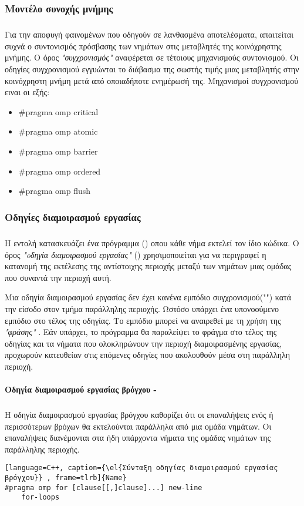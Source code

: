 \subsubsection{Μοντέλο συνοχής μνήμης}
\subparagraph{}
Για την αποφυγή φαινομένων \emph{} που οδηγούν σε λανθασμένα αποτελέσματα, απαιτείται συχνά ο συντονισμός πρόσβασης των νημάτων στις μεταβλητές της κοινόχρηστης μνήμης. Ο όρος \emph{"συγχρονισμός"} αναφέρεται σε τέτοιους μηχανισμούς συντονισμού. Οι οδηγίες συγχρονισμού εγγυώνται το διάβασμα της σωστής τιμής μιας μεταβλητής στην κοινόχρηστη μνήμη μετά από οποιαδήποτε ενημέρωσή της. Μηχανισμοί συγχρονισμού ειναι οι εξής\cite{book2_23}:
\begin{itemize}
    \item {\#}pragma omp critical 
    \item {\#}pragma omp atomic
    \item {\#}pragma omp barrier 
    \item {\#}pragma omp ordered
    \item {\#}pragma omp flush
\end{itemize}

\subsubsection{Οδηγίες διαμοιρασμού εργασίας}
\subparagraph{}
Η εντολή \emph{} κατασκευάζει ένα \emph{} πρόγραμμα (\emph{}) οπου κάθε νήμα εκτελεί τον ίδιο κώδικα. Ο όρος \emph{"oδηγία διαμοιρασμού εργασίας"} (\emph{}) χρησιμοποιείται για να περιγραφεί η κατανομή της εκτέλεσης της αντίστοιχης περιοχής μεταξύ των νημάτων μιας ομάδας που συναντά την περιοχή αυτή.

Μια οδηγία διαμοιρασμού εργασίας δεν έχει κανένα εμπόδιο συγχρονισμού("\emph{}") κατά την είσοδο στον τμήμα παράλληλης περιοχής. Ωστόσο υπάρχει ένα υπονοούμενο εμπόδιο στο τέλος της οδηγίας. Το εμπόδιο μπορεί να αναιρεθεί με τη χρήση της \emph{"φράσης"}  \emph{}. Εάν υπάρχει, το πρόγραμμα θα παραλείψει το φράγμα στο τέλος της οδηγίας και τα νήματα που ολοκληρώνουν την περιοχή διαμοιρασμένης εργασίας, προχωρούν κατευθείαν στις επόμενες οδηγίες που ακολουθούν μέσα στη παράλληλη περιοχή\cite{openmpse16}.
\clearpage
\paragraph{Οδηγία διαμοιρασμού εργασίας βρόγχου - \emph{}}
\subparagraph{}
Η οδηγία διαμοιρασμού εργασίας βρόγχου καθορίζει ότι οι επαναλήψεις ενός ή περισσότερων βρόχων θα εκτελούνται παράλληλα από μια ομάδα νημάτων. Οι επαναλήψεις διανέμονται στα ήδη υπάρχοντα νήματα της ομάδας νημάτων της παράλληλης περιοχής.
\ \\
\begin{lstlisting}[language=C++, caption={\el{Σύνταξη οδηγίας διαμοιρασμού εργασίας βρόγχου}} , frame=tlrb]{Name}
#pragma omp for [clause[[,]clause]...] new-line
	for-loops
\end{lstlisting}

